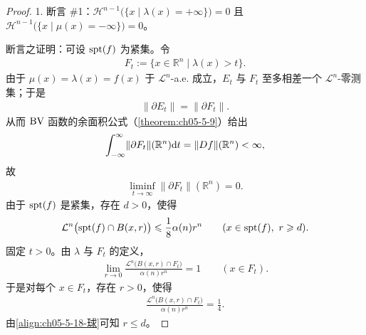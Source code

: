 \documentclass[../../main.tex]{subfiles}%
\begin{document}
\begin{proof}
1. 断言 \#1：$\mathcal{H}^{n-1}\bigl(\{x\mid\lambda(x)=+\infty\}\bigr)=0$ 且 $\mathcal{H}^{n-1}\bigl(\{x\mid\mu(x)=-\infty\}\bigr)=0$。

断言之证明：可设 $\operatorname{spt}(f)$ 为紧集。令
\begin{align*}
F_t:=\{x\in\mathbb{R}^n\mid\lambda(x)>t\}.
\end{align*}
由于 $\mu(x)=\lambda(x)=f(x)$ 于 $\mathcal{L}^n$-a.e. 成立，$E_t$ 与 $F_t$ 至多相差一个 $\mathcal{L}^n$-零测集；于是
\begin{align*}
\lVert\partial E_t\rVert=\lVert\partial F_t\rVert .
\end{align*}
从而 $\mathrm{BV}$ 函数的余面积公式（\cref{theorem:ch05-5-9}）给出 %
\begin{align*}
\int_{-\infty}^{\infty}\lVert\partial F_t\rVert(\mathbb{R}^n)\mathrm{d} t=\lVert Df\rVert(\mathbb{R}^n)<\infty ,
\end{align*}
故
\begin{align}
\liminf_{t\to\infty}\lVert\partial F_t\rVert(\mathbb{R}^n)=0 . \label{align:ch05-5-18-余面积}
\end{align}
由于 $\operatorname{spt}(f)$ 是紧集，存在 $d>0$，使得
\begin{align}
\mathcal{L}^n\bigl(\operatorname{spt}(f)\cap B(x,r)\bigr)\leqslant\frac18\alpha(n)r^n\qquad(x\in\operatorname{spt}(f),\ r\geqslant d). \label{align:ch05-5-18-球}
\end{align}
固定 $t>0$。由 $\lambda$ 与 $F_t$ 的定义，
\begin{align*}
\lim_{r\to0}\frac{\mathcal{L}^n\bigl(B(x,r)\cap F_t\bigr)}{\alpha(n)r^n}=1\qquad(x\in F_t).
\end{align*}
于是对每个 $x\in F_t$，存在 $r>0$，使得
\begin{align}
\frac{\mathcal{L}^n\bigl(B(x,r)\cap F_t\bigr)}{\alpha(n)r^n}=\frac14 . \label{align:ch05-5-18-比值}
\end{align}
由\eqref{align:ch05-5-18-球}可知 $r\leqslant d$。


\end{proof}
\end{document}
